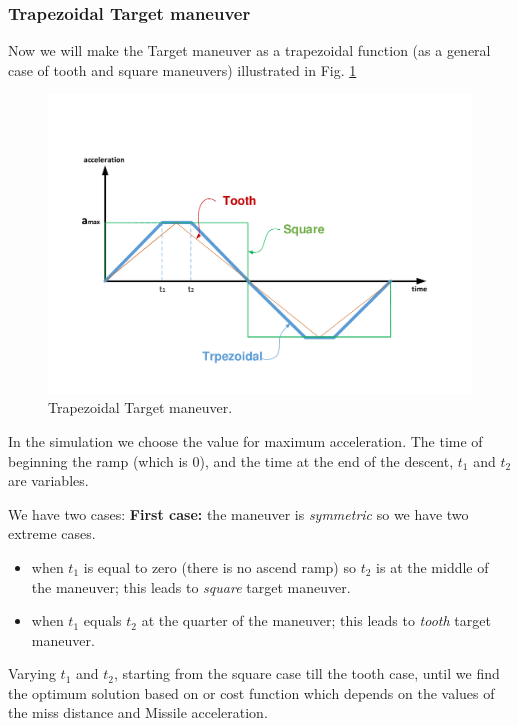 
\subsubsection{Trapezoidal Target maneuver}
Now we will make the Target maneuver as a trapezoidal function (as a general case of tooth and square maneuvers) illustrated in Fig. \ref{trapezoidalacc}


\begin{figure}[htb]
	\centering
	\includegraphics[scale = 0.60]{fig/toothSquareTrapezoidal.pdf}
	\caption{Trapezoidal Target maneuver.}
	\label{trapezoidalacc}
\end{figure}
In the simulation we choose the value for maximum acceleration. The time of beginning the ramp (which is 0), and the time at the end of the descent, $t_1$ and $t_2$ are variables. 

We have two cases: \textbf{First case:} the maneuver is \textit{symmetric} so we have two extreme cases.
\begin{itemize}
	\item when $t_1$ is equal to zero (there is no ascend ramp)  so $t_2$ is at the middle of the maneuver; this leads to \textit{square} target maneuver.
	\item when $t_1$ equals $t_2$ at the quarter of the maneuver; this leads to \textit{tooth} target maneuver.  
\end{itemize}
Varying $t_1$ and $t_2$, starting from the square case till the tooth case, until we find the optimum solution based on or cost function which depends on the values of the miss distance and Missile acceleration. 

